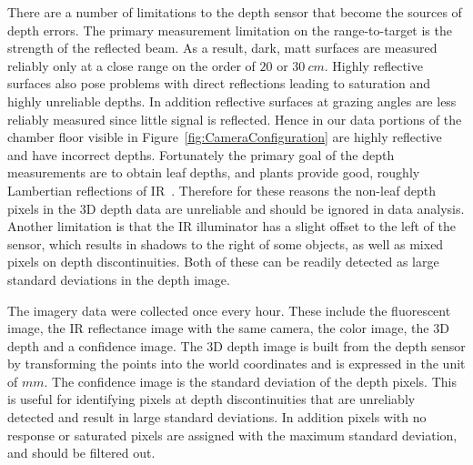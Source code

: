 There are a number of limitations to the depth sensor that become the sources of depth errors. 
The primary measurement limitation on the range-to-target is the strength of the reflected beam. 
As a result, dark, matt surfaces are measured reliably only at a close range on the order of $20$ or $30~cm$.  
Highly reflective surfaces also pose problems with direct reflections leading to saturation and highly unreliable depths.  
In addition reflective surfaces at grazing angles are less reliably measured since little signal is reflected. 
Hence in our data portions of the chamber floor visible in Figure~\ref{fig:CameraConfiguration} are highly reflective and have incorrect depths.  %
Fortunately the primary goal of the depth measurements are to obtain leaf depths, and plants provide good, roughly Lambertian reflections of IR~\cite{Chelle2006219}.  
Therefore for these reasons the non-leaf depth pixels in the $3$D depth data are unreliable and should be ignored in data analysis.  
Another limitation is that the IR illuminator has a slight offset to the left of the sensor, which results in shadows to the right of some objects, as well as mixed pixels on depth discontinuities.  
Both of these can be readily detected as large standard deviations in the depth image.


The imagery data were collected once every hour. %
These include the fluorescent image, the IR reflectance image with the same camera, the color image, the $3$D depth and a confidence image.  
The $3$D depth image is built from the depth sensor by transforming the points into the world coordinates and is expressed in the unit of $mm$.  
The confidence image is the standard deviation of the depth pixels.  
This is useful for identifying pixels at depth discontinuities that are unreliably detected and result in large standard deviations.  
In addition pixels with no response or saturated pixels are assigned with the maximum standard deviation, and should be filtered out.

